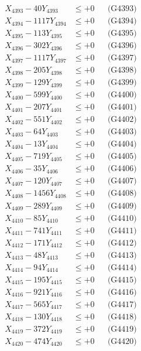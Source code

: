 \documentclass[a4paper,10pt]{article}
\begin{document}
{\begin{align}
X_{4393} - 40Y_{4393} &\leq +0 && \text{(G4393)} \\
X_{4394} - 1117Y_{4394} &\leq +0 && \text{(G4394)} \\
X_{4395} - 113Y_{4395} &\leq +0 && \text{(G4395)} \\
X_{4396} - 302Y_{4396} &\leq +0 && \text{(G4396)} \\
X_{4397} - 1117Y_{4397} &\leq +0 && \text{(G4397)} \\
X_{4398} - 205Y_{4398} &\leq +0 && \text{(G4398)} \\
X_{4399} - 129Y_{4399} &\leq +0 && \text{(G4399)} \\
X_{4400} - 599Y_{4400} &\leq +0 && \text{(G4400)} \\
\allowbreak
X_{4401} - 207Y_{4401} &\leq +0 && \text{(G4401)} \\
X_{4402} - 551Y_{4402} &\leq +0 && \text{(G4402)} \\
X_{4403} - 64Y_{4403} &\leq +0 && \text{(G4403)} \\
X_{4404} - 13Y_{4404} &\leq +0 && \text{(G4404)} \\
X_{4405} - 719Y_{4405} &\leq +0 && \text{(G4405)} \\
X_{4406} - 35Y_{4406} &\leq +0 && \text{(G4406)} \\
X_{4407} - 120Y_{4407} &\leq +0 && \text{(G4407)} \\
X_{4408} - 1456Y_{4408} &\leq +0 && \text{(G4408)} \\
X_{4409} - 289Y_{4409} &\leq +0 && \text{(G4409)} \\
X_{4410} - 85Y_{4410} &\leq +0 && \text{(G4410)} \\
\allowbreak
X_{4411} - 741Y_{4411} &\leq +0 && \text{(G4411)} \\
X_{4412} - 171Y_{4412} &\leq +0 && \text{(G4412)} \\
X_{4413} - 48Y_{4413} &\leq +0 && \text{(G4413)} \\
X_{4414} - 94Y_{4414} &\leq +0 && \text{(G4414)} \\
X_{4415} - 195Y_{4415} &\leq +0 && \text{(G4415)} \\
X_{4416} - 921Y_{4416} &\leq +0 && \text{(G4416)} \\
X_{4417} - 565Y_{4417} &\leq +0 && \text{(G4417)} \\
X_{4418} - 130Y_{4418} &\leq +0 && \text{(G4418)} \\
X_{4419} - 372Y_{4419} &\leq +0 && \text{(G4419)} \\
X_{4420} - 474Y_{4420} &\leq +0 && \text{(G4420)} \\

\end{align}}
\end{document}
